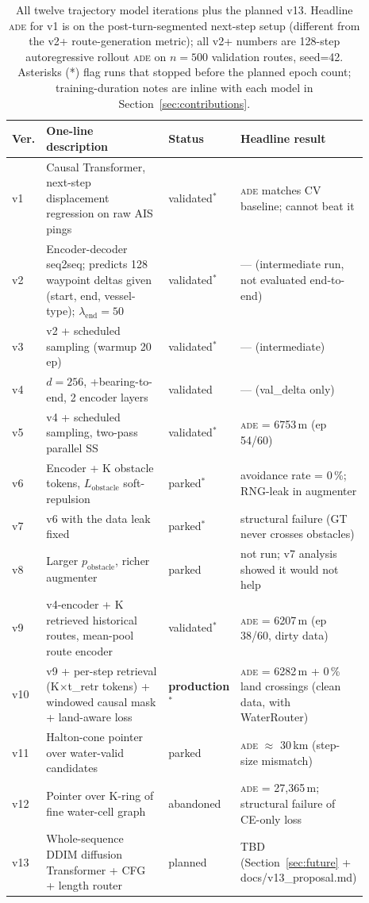 \documentclass[11pt,a4paper]{article}
\newcommand{\ade}{\textsc{ade}}
\begin{document}
\begin{table}[ht]
\centering
\caption{All twelve trajectory model iterations plus the planned v13.
         Headline \ade{} for v1 is on the post-turn-segmented next-step
         setup (different from the v2+ route-generation metric);
         all v2+ numbers are 128-step autoregressive rollout
         \ade{} on $n=500$ validation routes, seed=42.
         Asterisks (*) flag runs that stopped before the planned epoch count;
         training-duration notes are inline with each model in
         Section~\ref{sec:contributions}.}
\label{tab:summary}
\small
\begin{tabular}{p{0.06\linewidth}p{0.40\linewidth}p{0.13\linewidth}p{0.30\linewidth}}
\toprule
Ver. & One-line description & Status & Headline result \\
\midrule
v1   & Causal Transformer, next-step displacement regression
       on raw AIS pings
       & validated$^*$ & \ade{} matches CV baseline; cannot beat it \\
v2   & Encoder-decoder seq2seq; predicts 128 waypoint deltas
       given (start, end, vessel-type); $\lambda_\text{end}=50$
       & validated$^*$ & --- (intermediate run, not evaluated end-to-end) \\
v3   & v2 + scheduled sampling (warmup 20 ep)
       & validated$^*$ & --- (intermediate) \\
v4   & $d{=}256$, +bearing-to-end, 2 encoder layers
       & validated & --- (val\_delta only) \\
v5   & v4 + scheduled sampling, two-pass parallel SS
       & validated$^*$ & \ade{} = 6753\,m (ep 54/60) \\
v6   & Encoder + K obstacle tokens, $L_\text{obstacle}$ soft-repulsion
       & parked$^*$ & avoidance rate = 0\,\%; RNG-leak in augmenter \\
v7   & v6 with the data leak fixed
       & parked$^*$ & structural failure (GT never crosses obstacles) \\
v8   & Larger $p_\text{obstacle}$, richer augmenter
       & parked & not run; v7 analysis showed it would not help \\
v9   & v4-encoder + K retrieved historical routes,
       mean-pool route encoder
       & validated$^*$ & \ade{} = 6207\,m (ep 38/60, dirty data) \\
v10  & v9 + per-step retrieval (K$\times$t\_retr tokens) +
       windowed causal mask + land-aware loss
       & \textbf{production}$^*$ & \ade{} = 6282\,m + 0\,\% land crossings
       (clean data, with WaterRouter) \\
v11  & Halton-cone pointer over water-valid candidates
       & parked & \ade{} $\approx$ 30\,km (step-size mismatch) \\
v12  & Pointer over K-ring of fine water-cell graph
       & abandoned & \ade{} = 27{,}365\,m; structural failure of CE-only loss \\
v13  & Whole-sequence DDIM diffusion Transformer + CFG +
       length router
       & planned & TBD (Section~\ref{sec:future} + docs/v13\_proposal.md) \\
\bottomrule
\end{tabular}
\end{table}
\end{document}
